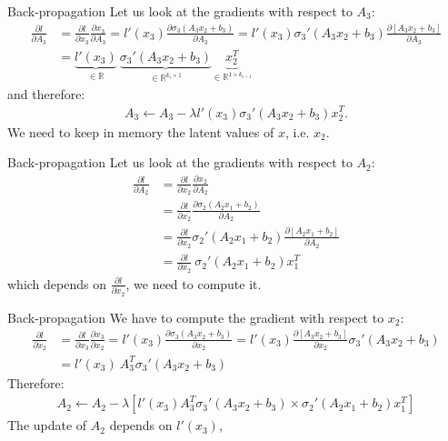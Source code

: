 \begin{frame}{}{Back-propagation}
	Let us look at the gradients with respect to $A_3$:
	\begin{align*}
		\frac{\partial l}{\partial A_3} & = \frac{\partial l}{\partial x_3}\frac{\partial x_3}{\partial A_3} =l'(x_3)\frac{\partial \sigma_3\left(A_3x_2+b_3\right)}{\partial A_3} = l'(x_3)\sigma_3'\left(A_3x_2+b_3\right)\frac{\partial \left[A_3x_2+b_3\right]}{\partial A_3} \\
		                                & = \underbrace{l'(x_3)}_{\in\mathbb{R}}\:\underbrace{\sigma_3'\left(A_3x_2+b_3\right)}_{\in\mathbb{R}^{k_i\times 1}}\underbrace{x_2^T}_{\in\mathbb{R}^{1\times k_{i-1}}}
	\end{align*}
	and therefore:
	\begin{align*}
		A_3 \leftarrow A_3 - \lambda l'(x_3)\sigma_3'\left(A_3x_2+b_3\right)x_2^T.
	\end{align*}
	We need to keep in memory the latent values of $x$, i.e. $x_2$.
\end{frame}

\begin{frame}{}{Back-propagation}
	Let us look at the gradients with respect to $A_2$:
	\begin{align*}
		\frac{\partial l}{\partial A_2} & = \frac{\partial l}{\partial x_2}\frac{\partial x_2}{\partial A_2}                                                    \\
		                                & =\frac{\partial l}{\partial x_2}\frac{\partial \sigma_2\left(A_2x_1+b_2\right)}{\partial A_2}                         \\
		                                & =\frac{\partial l}{\partial x_2}\sigma_2'\left(A_2x_1+b_2\right)\frac{\partial \left[A_2x_1+b_2\right]}{\partial A_2} \\
		                                & =\frac{\partial l}{\partial x_2} \: \sigma_2'\left(A_2x_1+b_2\right)x_1^T
	\end{align*}
	which depends on $\frac{\partial l}{\partial x_2}$, we need to compute it.
\end{frame}
\begin{frame}{}{Back-propagation}
	We have to compute the gradient with respect to $x_2$:
	\begin{align*}
		\frac{\partial l}{\partial x_2} & = \frac{\partial l}{\partial x_3}\frac{\partial x_3}{\partial x_2} =l'(x_3)\frac{\partial \sigma_3\left(A_3x_2+b_3\right)}{\partial x_2} = l'(x_3)\frac{\partial \left[A_3x_2+b_3\right]}{\partial x_2}\sigma_3'\left(A_3x_2+b_3\right) \\
		                                & =l'(x_3)\:A_3^T\sigma_3'\left(A_3x_2+b_3\right)
	\end{align*}
	Therefore:
	\begin{align*}
		A_2 \leftarrow A_2 - \lambda \left[l'(x_3)A_3^T\sigma_3'\left(A_3x_2+b_3\right) \times  \sigma_2'\left(A_2x_1+b_2\right)x_1^T \right]
	\end{align*}
	The update of $A_2$ depends on $l'(x_3)$,
\end{frame}



